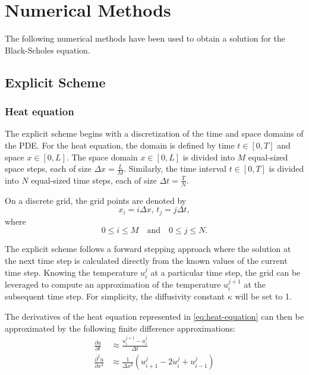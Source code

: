 

\section{Numerical Methods}\label{sec:numerical-methods}
The following numerical methods have been used to obtain a solution for the Black-Scholes equation.

\subsection{Explicit Scheme}\label{sec:explicit}

\subsubsection{Heat equation}
The explicit scheme begins with a discretization of the time and space domains of the PDE.
For the heat equation, the domain is defined by time $t \in [0, T]$ and space $x \in [0,L]$. The space domain $x \in [0,L]$ is divided into $M$ equal-sized space steps, each of size ${\Delta x} = \frac{L}{M}$. Similarly, the time interval $t \in [0, T]$ is divided into $N$ equal-sized time steps, each of size ${\Delta t} = \frac{T}{N}$.

On a discrete grid, the grid points are denoted by
\[
x_i = i {\Delta x},\, t_j = j {\Delta t},
\]
where
\[
0 \leq i \leq M \quad \text{and} \quad 0 \leq j \leq N.
\]

The explicit scheme follows a forward stepping approach where the solution at the next time step is calculated directly from
the known values of the current time step. Knowing the temperature $u_i^j$ at a particular time step, the grid can be leveraged to compute an
approximation of the temperature $u_i^{j+1}$ at the subsequent time step. For simplicity, the diffusivity constant $\kappa$ will be set to 1.

The derivatives of the heat equation represented in \eqref{eq:heat-equation} can then be approximated by the following finite difference approximations:
\begin{align}
    \frac{\partial u}{\partial t} &\approx \frac{u_i^{j+1} - u_i^{j}}{\Delta t} \tag{Time Derivative} \\
    \frac{\partial^2 u}{\partial x^2} &\approx \frac {1}{\Delta x^2} (u_{i+1}^j - 2u_i^j + u_{i-1}^j) \tag{Spatial Second Derivative}
\end{align}

